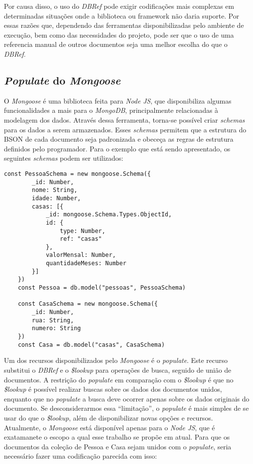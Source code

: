 Por causa disso, o uso do \textit{DBRef} pode exigir codificações mais complexas em determinadas situações onde a biblioteca ou framework não daria suporte. Por essas razões que, dependendo das ferramentas disponibilizadas pelo ambiente de execução, bem como das necessidades do projeto, pode ser que o uso de uma referencia manual de outros documentos seja uma melhor escolha do que o \textit{DBRef}.

\subsection{\textit{Populate} do \textit{Mongoose}}

O \textit{Mongoose} é uma biblioteca feita para \textit{Node JS}, que disponibiliza algumas funcionalidades a mais para o \textit{MongoDB}, principalmente relacionadas à modelagem dos dados. Através dessa ferramenta, torna-se possível criar \textit{schemas} para os dados a serem armazenados. Esses \textit{schemas} permitem que a estrutura do BSON de cada documento seja padronizada e obeceça as regras de estrutura definidos pelo programador. Para o exemplo que está sendo apresentado, os seguintes \textit{schemas} podem ser utilizados:

\newpage

\begin{lstlisting}[style=ES6, caption={Definição de \textit{Schemas} no \textit{Mongoose}}]
    const PessoaSchema = new mongoose.Schema({
        _id: Number,
        nome: String,
        idade: Number,
        casas: [{
            _id: mongoose.Schema.Types.ObjectId,
            id: {
                type: Number,
                ref: "casas"
            },
            valorMensal: Number,
            quantidadeMeses: Number
        }]
    })
    const Pessoa = db.model("pessoas", PessoaSchema)

    const CasaSchema = new mongoose.Schema({
        _id: Number,
        rua: String,
        numero: String
    })
    const Casa = db.model("casas", CasaSchema)
\end{lstlisting}

Um dos recursos disponibilizados pelo \textit{Mongoose} é o \textit{populate}. Este recurso substitui o \textit{DBRef} e o \textit{\$lookup} para operações de busca, seguido de união de documentos. A restrição do \textit{populate} em comparação com o \textit{\$lookup} é que no \textit{\$lookup} é possível realizar buscas sobre os dados dos documentos unidos, enquanto que no \textit{populate} a busca deve ocorrer apenas sobre os dados originais do documento. Se desconsiderarmos essa ``limitação'', o \textit{populate} é mais simples de se usar do que o \textit{\$lookup}, além de disponibilizar novas opções e recursos. Atualmente, o \textit{Mongoose} está disponível apenas para o \textit{Node JS}, que é exatamanete o escopo a qual esse trabalho se propõe em atual. Para que os documentos da coleção de Pessoa e Casa sejam unidos com o \textit{populate}, seria necessário fazer uma codificação parecida com isso:

